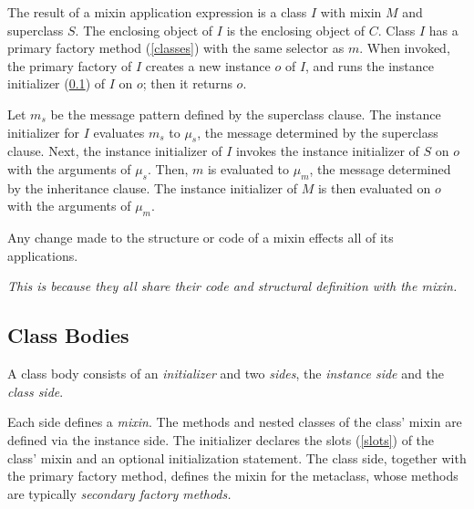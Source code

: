 \documentclass{article}
\newcommand{\code}[1]{{\sf #1}}
\begin{document}

The result of a mixin application expression is a class $I$ with mixin $M$ and superclass $S$.
The enclosing object of $I$ is the enclosing object of $C$. 
Class $I$ has a primary factory method  (\ref{classes}) with the same selector as $m$. 
When invoked, the primary factory of $I$ creates a new instance $o$  of $I$,  and runs the instance initializer (\ref{classBodies}) of $I$ on $o$; then it returns $o$. 

Let $m_s$ be the message pattern defined by the superclass clause.
The instance initializer for $I$ evaluates $m_s$ to $\mu_s$, the message determined by the superclass clause.  Next, the instance initializer of $I$ invokes the instance initializer  of $S$ on $o$ with the arguments of $\mu_s$. Then, $m$ is evaluated to $\mu_m$, the message determined by the inheritance clause. The instance initializer of $M$ is then  evaluated on $o$ with the arguments of $\mu_m$. 


Any change made to the structure or code of a mixin effects all of its applications.

{\it This is because they all share their code and structural definition with the mixin.}
 

\subsection{Class Bodies}
\label{classBodies}

A class body consists of an {\em initializer} and two {\em sides}, the {\em instance side} and the {\em class side}.

Each side defines a {\em mixin}. 
The methods and nested classes of the class'  mixin are defined via the instance side. The initializer declares the slots (\ref{slots}) of the class'   mixin and an optional initialization statement.
The class side, together with the primary factory method,  defines the mixin for the metaclass, whose methods are typically {\em secondary factory methods.} 
\end{document}
